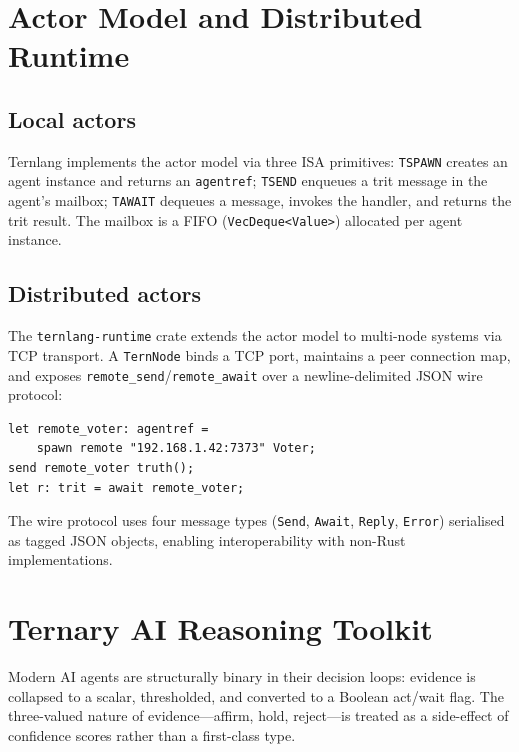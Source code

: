 \documentclass[11pt,a4paper]{article}
\begin{document}
\section{Actor Model and Distributed Runtime}
\label{sec:actors}

\subsection{Local actors}

Ternlang implements the actor model via three ISA primitives:
\texttt{TSPAWN} creates an agent instance and returns an \texttt{agentref};
\texttt{TSEND} enqueues a trit message in the agent's mailbox; \texttt{TAWAIT}
dequeues a message, invokes the handler, and returns the trit result. The
mailbox is a FIFO (\texttt{VecDeque<Value>}) allocated per agent instance.

\subsection{Distributed actors}

The \texttt{ternlang-runtime} crate extends the actor model to multi-node
systems via TCP transport. A \texttt{TernNode} binds a TCP port, maintains a
peer connection map, and exposes \texttt{remote\_send}/\texttt{remote\_await}
over a newline-delimited JSON wire protocol:

\begin{lstlisting}[language=ternlang,
  caption={Remote actor spawn in ternlang}]
let remote_voter: agentref =
    spawn remote "192.168.1.42:7373" Voter;
send remote_voter truth();
let r: trit = await remote_voter;
\end{lstlisting}

The wire protocol uses four message types (\texttt{Send}, \texttt{Await},
\texttt{Reply}, \texttt{Error}) serialised as tagged JSON objects, enabling
interoperability with non-Rust implementations.

\section{Ternary AI Reasoning Toolkit}
\label{sec:reasoning}

Modern AI agents are structurally binary in their decision loops: evidence
is collapsed to a scalar, thresholded, and converted to a Boolean act/wait
flag. The three-valued nature of evidence—affirm, hold, reject—is treated
as a side-effect of confidence scores rather than a first-class type.
\end{document}
